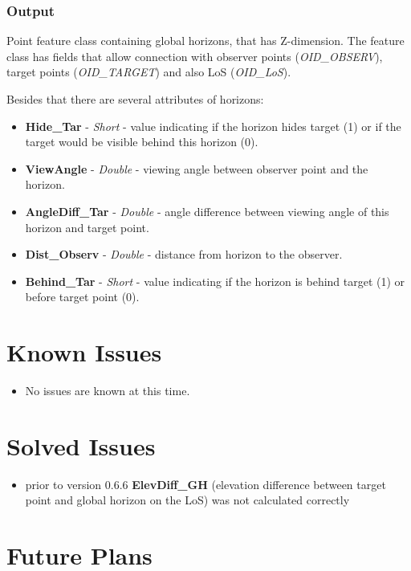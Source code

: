 \documentclass[]{article}
\begin{document}
\subsubsection{Output}

Point feature class containing global horizons, that has Z-dimension. The feature class has fields that allow connection with observer points (\textit{OID\_OBSERV}), target points (\textit{OID\_TARGET}) and also LoS (\textit{OID\_LoS}). 

Besides that there are several attributes of horizons:
\begin{itemize}
	\item \textbf{Hide\_Tar} - \textit{Short} - value indicating if the horizon hides target (1) or if the target would be visible behind this horizon (0).
	\item \textbf{ViewAngle} - \textit{Double} - viewing angle between observer point and the horizon.
	\item \textbf{AngleDiff\_Tar} - \textit{Double} - angle difference between viewing angle of this horizon and target point. 
	\item \textbf{Dist\_Observ} - \textit{Double} - distance from horizon to the observer.
	\item \textbf{Behind\_Tar} - \textit{Short} - value indicating if the horizon is behind target (1) or before target point (0).
\end{itemize}

\section{Known Issues}

\begin{itemize}
	\item No issues are known at this time.
\end{itemize}

\section{Solved Issues}

\begin{itemize}
	\item prior to version 0.6.6 \textbf{ElevDiff\_GH} (elevation difference between target point and global horizon on the LoS) was not calculated correctly
\end{itemize}

\section{Future Plans}
\end{document}
